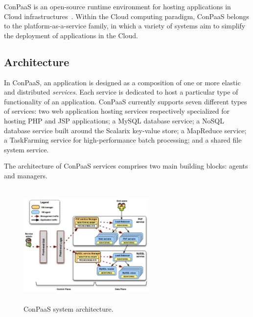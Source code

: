 

ConPaaS is an open-source runtime environment for hosting applications
in Cloud infrastructures~\cite{conpaasIC}.  Within the Cloud computing
paradigm, ConPaaS belongs to the platform-as-a-service family, in
which a variety of systems aim to simplify the deployment of
applications in the Cloud.


\subsection*{Architecture}

In ConPaaS, an application is designed as a composition of one or more
elastic and distributed \emph{services}. Each service is dedicated to
host a particular type of functionality of an application. ConPaaS
currently supports seven different types of services: two web
application hosting services respectively specialized for hosting PHP
and JSP applications; a MySQL database service; a NoSQL database
service built around the Scalarix key-value store; a MapReduce
service; a TaskFarming service for high-performance batch
processing; and a shared file system service.

The architecture of ConPaaS services comprises two main building
blocks: agents and managers.

\begin{figure}[Ht]
\begin{center}
\includegraphics[width=0.6\textwidth, height=6.2cm]{./images/conpaasSystemArch_2}
\end{center}
\vspace{-5mm}
\caption{ConPaaS system architecture.}
\label{arch}
\end{figure}

